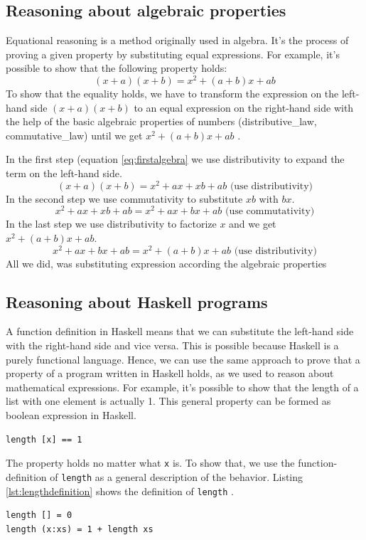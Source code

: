 \subsection{Reasoning about algebraic properties}

Equational reasoning is a method originally used in algebra. It's the process of proving a given property by substituting equal expressions.
For example, it's possible to show that the following property holds:
\begin{equation}
  \label{eq:sum}
  (x+a)(x+b) = x^2 + (a+b)x+ab
\end{equation}
To show that the equality holds, we have to transform the expression on the left-hand side  $(x+a)(x+b)$  to an equal expression on the right-hand side with the help of the basic algebraic properties of numbers (\gls{distributive_law}, \gls{commutative_law}) until we get $x^2 + (a+b)x+ab$  \cite{hutton}. 

In the first step (equation \ref{eq:firstalgebra} we use distributivity to expand the term on the left-hand side.
\begin{equation}
  \label{eq:firstalgebra}
  (x+a)(x+b) = x^2 + ax + xb + ab \text{     (use distributivity)}
\end{equation}
In the second step we use commutativity to substitute $xb$ with $bx$.
\begin{equation}
x^2 + ax + xb + ab = x^2 + ax + bx + ab \text{     (use commutativity)}
\end{equation}
In the last step we use distributivity to factorize $x$ and we get $x^2 + (a+b)x+ab$.
\begin{equation}
x^2 + ax + bx + ab = x^2 + (a + b)x + ab \text{     (use distributivity)}
\end{equation}
All we did, was substituting expression according the algebraic properties 

\subsection{Reasoning about Haskell programs}

A function definition in Haskell means that we can substitute the left-hand side with the right-hand side and vice versa. This is possible because Haskell is a purely functional language. Hence, we can use the same approach to prove that a property of a program written in Haskell holds, as we used to reason about mathematical expressions. 
For example, it's possible to show that the length of a list with one element is actually 1. This general property can be formed as boolean expression in Haskell.
\begin{verbatim}
length [x] == 1
\end{verbatim}
The property holds no matter what \verb|x| is. To show that, we use the \gls{function-definition} of \verb|length| as a general description of the behavior. Listing \ref{lst:lengthdefinition} shows the definition of \verb|length| \cite{hutton}.
\begin{lstlisting}[caption={Function definition of {\ttfamily length}},label={lst:lengthdefinition}]
length [] = 0
length (x:xs) = 1 + length xs  
\end{lstlisting}

